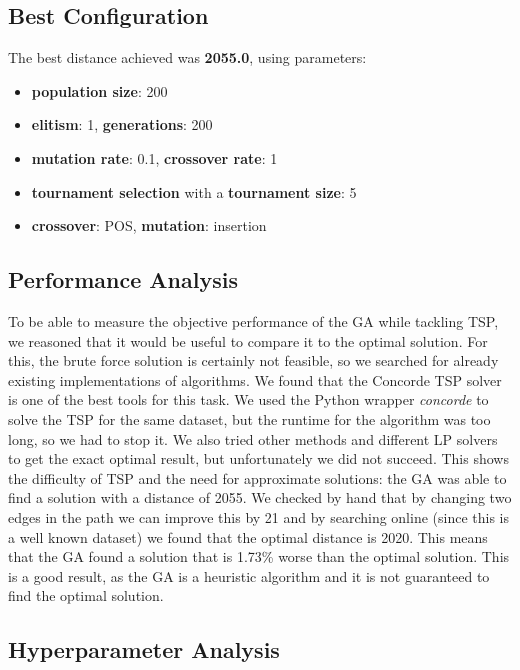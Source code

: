 \documentclass[11pt]{article}
\begin{document}
\subsection{Best Configuration}

The best distance achieved was \textbf{2055.0}, using parameters:
\begin{itemize}
    \item \textbf{population size}: 200
    \item \textbf{elitism}: 1,  \textbf{generations}: 200
    \item \textbf{mutation rate}: 0.1,  \textbf{crossover rate}: 1
    \item \textbf{tournament selection} with a \textbf{tournament size}: 5
    \item \textbf{crossover}: POS,   \textbf{mutation}: insertion
\end{itemize}

\subsection{Performance Analysis}
To be able to measure the objective performance of the GA while tackling TSP, we reasoned that it would be useful to compare it to the optimal solution. For this, the brute force solution is certainly not feasible, so we searched for already existing implementations of algorithms. We found that the Concorde TSP solver is one of the best tools for this task. We used the Python wrapper \textit{concorde} to solve the TSP for the same dataset, but the runtime for the algorithm was too long, so we had to stop it. We also tried other methods and different LP solvers to get the exact optimal result, but unfortunately we did not succeed. This shows the difficulty of TSP and the need for approximate solutions: the GA was able to find a solution with a distance of 2055. We checked by hand that by changing two edges in the path we can improve this by 21 and by searching online (since this is a well known dataset) we found that the optimal distance is 2020. This means that the GA found a solution that is 1.73\% worse than the optimal solution. This is a good result, as the GA is a heuristic algorithm and it is not guaranteed to find the optimal solution.

\subsection{Hyperparameter Analysis}
\end{document}
